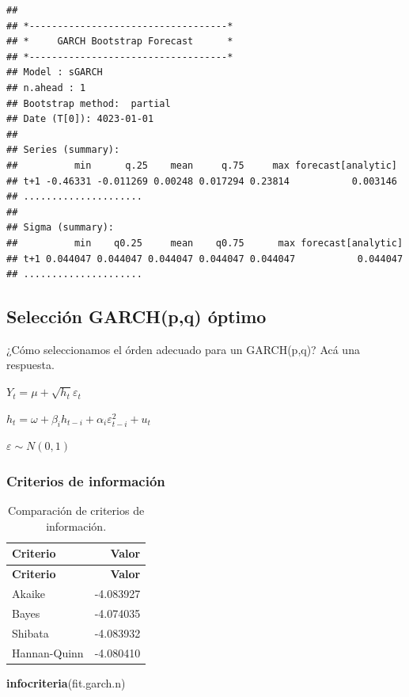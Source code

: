 \documentclass[
]{book}
\newenvironment{Shaded}{\begin{snugshade}}{\end{snugshade}}
\newcommand{\FunctionTok}[1]{\textcolor[rgb]{0.13,0.29,0.53}{\textbf{#1}}}
\newcommand{\NormalTok}[1]{#1}
\begin{document}
\begin{verbatim}
## 
## *-----------------------------------*
## *     GARCH Bootstrap Forecast      *
## *-----------------------------------*
## Model : sGARCH
## n.ahead : 1
## Bootstrap method:  partial
## Date (T[0]): 4023-01-01
## 
## Series (summary):
##          min      q.25    mean     q.75     max forecast[analytic]
## t+1 -0.46331 -0.011269 0.00248 0.017294 0.23814           0.003146
## .....................
## 
## Sigma (summary):
##          min    q0.25     mean    q0.75      max forecast[analytic]
## t+1 0.044047 0.044047 0.044047 0.044047 0.044047           0.044047
## .....................
\end{verbatim}

\hypertarget{selecciuxf3n-garchpq-uxf3ptimo}{%
\subsection{Selección GARCH(p,q) óptimo}\label{selecciuxf3n-garchpq-uxf3ptimo}}

¿Cómo seleccionamos el órden adecuado para un GARCH(p,q)? Acá una respuesta.

\(Y_t = \mu+\sqrt{h_t}\varepsilon_t\)

\(h_t = \omega+\beta_ih_{t-i}+\alpha_i\varepsilon^2_{t-i}+u_t\)

\(\varepsilon \sim N(0,1)\)

\hypertarget{criterios-de-informaciuxf3n}{%
\subsubsection{Criterios de información}\label{criterios-de-informaciuxf3n}}

\begin{longtable}[]{@{}lr@{}}
\caption{\label{tab:info-criteria} Comparación de criterios de información.}\tabularnewline
\toprule\noalign{}
\textbf{Criterio} & \textbf{Valor} \\
\midrule\noalign{}
\endfirsthead
\toprule\noalign{}
\textbf{Criterio} & \textbf{Valor} \\
\midrule\noalign{}
\endhead
\bottomrule\noalign{}
\endlastfoot
Akaike & -4.083927 \\
Bayes & -4.074035 \\
Shibata & -4.083932 \\
Hannan-Quinn & -4.080410 \\
\end{longtable}

\begin{Shaded}
\begin{Highlighting}[]
\FunctionTok{infocriteria}\NormalTok{(fit.garch.n)}
\end{Highlighting}
\end{Shaded}
\end{document}
